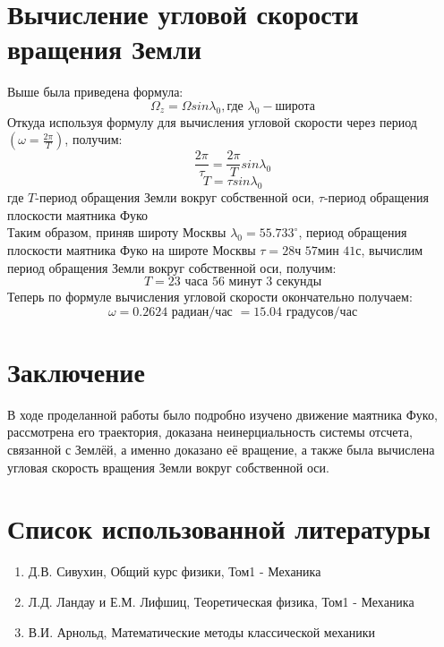\documentclass[a4, 12pt]{article}
\begin{document}
\section{Вычисление угловой скорости вращения Земли}
Выше была приведена формула:
\begin{equation}
    \Omega_z = \Omega sin\lambda_0, \text{где } \lambda_0 - \text{широта}
\end{equation}
Откуда используя формулу для вычисления угловой скорости через период $(\omega=\frac{2\pi}{T})$, получим:
\begin{equation}
    \frac{2\pi}{\tau}=\frac{2\pi}{T}sin\lambda_0
\end{equation}
\begin{equation}
    T=\tau sin\lambda_0
\end{equation}
где $T$-период обращения Земли вокруг собственной оси, $\tau$-период обращения плоскости маятника Фуко\\
Таким образом, приняв широту Москвы $\lambda_0=55.733^\circ$, период обращения плоскости маятника Фуко на широте Москвы $\tau=28\text{ч }57\text{мин }41\text{с}$, вычислим период обращения Земли вокруг собственной оси, получим:
\begin{equation}
    T=23\text{ часа }56\text{ минут }3\text{ секунды}
\end{equation}
Теперь по формуле вычисления угловой скорости окончательно получаем:
\begin{equation}
    \omega=0.2624\text{ радиан/час }=15.04\text{ градусов/час}
\end{equation}
\section{Заключение}
В ходе проделанной работы было подробно изучено движение маятника Фуко, рассмотрена его траектория, доказана неинерциальность системы отсчета, связанной с Землёй, а именно доказано её вращение, а также была вычислена угловая скорость вращения Земли вокруг собственной оси.
\section{Список использованной литературы}
\begin{enumerate}
    \item Д.В. Сивухин, Общий курс физики, Том1 - Механика
    \item Л.Д. Ландау и Е.М. Лифшиц, Теоретическая физика, Том1 - Механика
    \item В.И. Арнольд, Математические методы классической механики
\end{enumerate}
\end{document}
